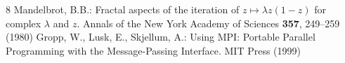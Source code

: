 \documentclass[runningheads]{llncs}
\begin{document}
\begin{thebibliography}{8}
 Mandelbrot, B.B.: Fractal aspects of the iteration of $z\mapsto\lambda z(1-z)$ for complex
$\lambda$ and $z$. Annals of the New York Academy of Sciences \textbf{357}, 249--259 (1980)
 Gropp, W., Lusk, E., Skjellum, A.: Using MPI: Portable Parallel Programming with the
Message-Passing Interface. MIT Press (1999)
\end{thebibliography}
\end{document}
